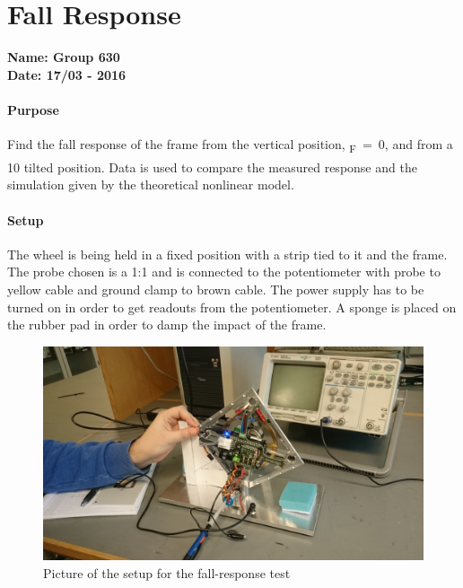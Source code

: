\chapter{Fall Response}\label{fallResponseAppendix} 
\textbf{Name: Group 630}\\
\textbf{Date: 17/03 - 2016}

\subsubsection{Purpose}
Find the fall response of the frame from the vertical position, \si{\theta_F=0}, and from a \si{10^\circ} tilted position.
Data is used to compare the measured response and the simulation given by the theoretical nonlinear model.

\subsubsection{Setup}
The wheel is being held in a fixed position with a strip tied to it and the frame. The probe chosen is a 1:1 and is connected to the potentiometer with probe to yellow cable and ground clamp to brown cable. The power supply has to be turned on in order to get readouts from the potentiometer. A sponge is placed on the rubber pad in order to damp the impact of the frame.
\begin{figure}[H]                                   
	\centering                                        
	\includegraphics[scale=0.08]{figures/stepResponseSetup}
	\caption{Picture of the setup for the fall-response test}
	\label{stepResponseTestPicture} 
\end{figure}              

